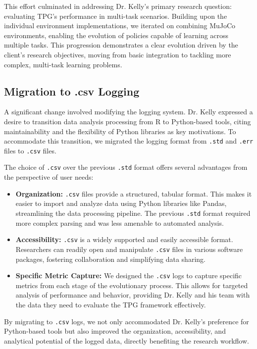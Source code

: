 \documentclass{article}
\begin{document}
This effort culminated in addressing Dr. Kelly's primary research question: evaluating TPG's performance in multi-task scenarios. Building upon the individual environment implementations, we iterated on combining MuJoCo environments, enabling the evolution of policies capable of learning across multiple tasks. This progression demonstrates a clear evolution driven by the client's research objectives, moving from basic integration to tackling more complex, multi-task learning problems.

\subsection{Migration to .csv Logging}

A significant change involved modifying the logging system. Dr. Kelly expressed a desire to transition data analysis processing from R to Python-based tools, citing maintainability and the flexibility of Python libraries as key motivations. To accommodate this transition, we migrated the logging format from \texttt{.std} and \texttt{.err} files to \texttt{.csv} files.

The choice of \texttt{.csv} over the previous \texttt{.std} format offers several advantages from the perspective of user needs:

\begin{itemize}
    \item \textbf{Organization:} \texttt{.csv} files provide a structured, tabular format. This makes it easier to import and analyze data using Python libraries like Pandas, streamlining the data processing pipeline. The previous \texttt{.std} format required more complex parsing and was less amenable to automated analysis.
    \item \textbf{Accessibility:} \texttt{.csv} is a widely supported and easily accessible format. Researchers can readily open and manipulate \texttt{.csv} files in various software packages, fostering collaboration and simplifying data sharing.
    \item \textbf{Specific Metric Capture:} We designed the \texttt{.csv} logs to capture specific metrics from each stage of the evolutionary process. This allows for targeted analysis of performance and behavior, providing Dr. Kelly and his team with the data they need to evaluate the TPG framework effectively.
\end{itemize}

By migrating to \texttt{.csv} logs, we not only accommodated Dr. Kelly's preference for Python-based tools but also improved the organization, accessibility, and analytical potential of the logged data, directly benefiting the research workflow.
\end{document}
